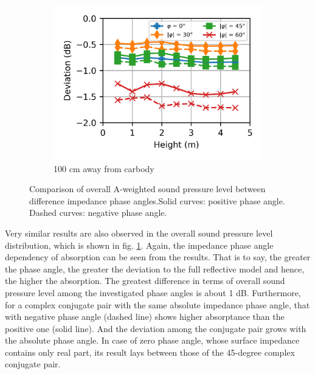 \begin{figure}[H]
\begin{subfigure}[b]{\textwidth}
		\includegraphics{fig/chap5/impedance/overall_SPL/deviation_pos_g.png}
		\caption{100 cm away from carbody}
	\end{subfigure}
	
	\caption{Comparison of overall A-weighted sound pressure level between difference impedance phase angles.Solid curves: positive phase angle. Dashed curves: negative phase angle.}
	\label{fig:overall_SPL_impedance}
\end{figure}

\noindent Very similar results are also observed in the overall sound pressure level distribution, which is shown in fig. \ref{fig:overall_SPL_impedance}. Again, the impedance phase angle dependency of absorption can be seen from the results. That is to say, the greater the phase angle, the greater the deviation to the full reflective model and hence, the higher the absorption. The greatest difference in terms of overall sound pressure level among the investigated phase angles is about 1 dB. Furthermore, for a complex conjugate pair with the same absolute impedance phase angle, that with negative phase angle (dashed line) shows higher absorptance than the positive one (solid line). And the deviation among the conjugate pair grows with the absolute phase angle. In case of zero phase angle, whose surface impedance contains only real part, its result lays between those of the 45-degree complex conjugate pair.

